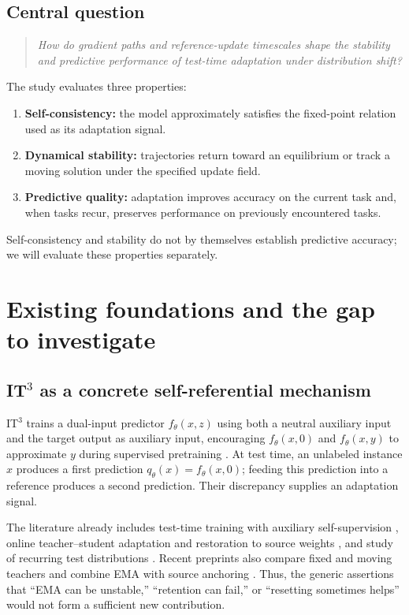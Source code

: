 \documentclass[11pt,a4paper]{article}
\begin{document}
\subsection{Central question}
\begin{quote}
\itshape How do gradient paths and reference-update timescales shape the stability and predictive performance of test-time adaptation under distribution shift?
\end{quote}

The study evaluates three properties:
\begin{enumerate}
\item \textbf{Self-consistency:} the model approximately satisfies the fixed-point relation used as its adaptation signal.
\item \textbf{Dynamical stability:} trajectories return toward an equilibrium or track a moving solution under the specified update field.
\item \textbf{Predictive quality:} adaptation improves accuracy on the current task and, when tasks recur, preserves performance on previously encountered tasks.
\end{enumerate}
Self-consistency and stability do not by themselves establish predictive accuracy; we will evaluate these properties separately.

\newpage
\section{Existing foundations and the gap to investigate}

\subsection{\texorpdfstring{IT$^3$}{IT3} as a concrete self-referential mechanism}
IT$^3$ trains a dual-input predictor $f_\theta(x,z)$ using both a neutral auxiliary input and the target output as auxiliary input, encouraging $f_\theta(x,0)$ and $f_\theta(x,y)$ to approximate $y$ during supervised pretraining \cite{it3}. At test time, an unlabeled instance $x$ produces a first prediction $q_\theta(x)=f_\theta(x,0)$; feeding this prediction into a reference produces a second prediction. Their discrepancy supplies an adaptation signal.

The literature already includes test-time training with auxiliary self-supervision \cite{sun2020}, online teacher--student adaptation and restoration to source weights \cite{cotta2022,eata2022,rmt2023}, and study of recurring test distributions \cite{petta2024}. Recent preprints also compare fixed and moving teachers and combine EMA with source anchoring \cite{sojka2026,desa2026}. Thus, the generic assertions that ``EMA can be unstable,'' ``retention can fail,'' or ``resetting sometimes helps'' would not form a sufficient new contribution.
\end{document}
